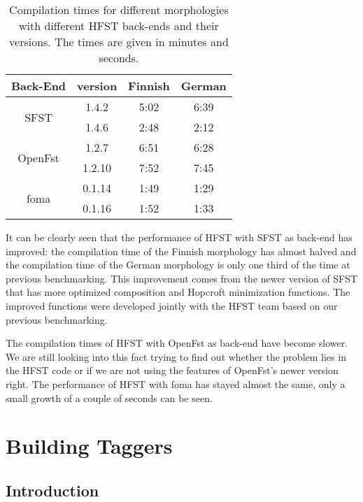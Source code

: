 \documentclass{llncs}
\begin{document}
\begin{table} [h!]
\centering
  \caption{Compilation times for different morphologies with
    different HFST back-ends and their versions. 
    The times are given in minutes and seconds.}
  \begin{tabular}{| c | c | c | c |}
  \hline
  Back-End                 & version  & Finnish  & German \\ \hline\hline
  \multirow{2}{*}{SFST}    & 1.4.2    & 5:02     & 6:39 \\
                           & 1.4.6    & 2:48     & 2:12 \\ \hline
  \multirow{2}{*}{OpenFst} & 1.2.7    & 6:51     & 6:28 \\
                           & 1.2.10   & 7:52     & 7:45 \\ \hline
  \multirow{2}{*}{foma}    & 0.1.14   & 1:49     & 1:29 \\
                           & 0.1.16   & 1:52     & 1:33 \\
\hline
  \end{tabular}
  \label{tab:compilation_times_versions}
\end{table}

It can be clearly seen that the performance of HFST with SFST as back-end 
has improved: the compilation time of the Finnish morphology has almost
halved and the compilation time of the German morphology is only one third of the
time at previous benchmarking. 
This improvement comes from the newer version of SFST that has more optimized
composition and Hopcroft minimization functions. The improved functions 
were developed jointly with the HFST team based on our previous benchmarking.

The compilation times of HFST with OpenFst as back-end have become slower.
We are still looking into this fact trying to find out whether
the problem lies in the HFST code or if we are not using the features of 
OpenFst's newer version right.
The performance of HFST with foma has stayed almost the same, only a small
growth of a couple of seconds can be seen.
 

\section{Building Taggers}

\subsection{Introduction}
\end{document}
